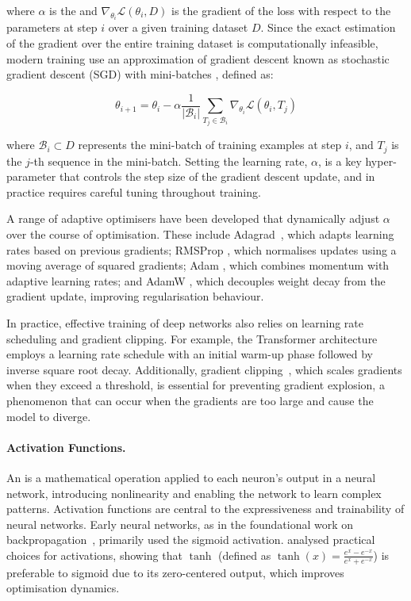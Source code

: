 where $\alpha$ is the  and $\nabla_{\theta_i} \mathcal{L}(\theta_i, D)$ is the gradient of the loss with respect to the parameters at step $i$ over a given training dataset $D$. Since the exact estimation of the gradient over the entire training dataset is computationally infeasible, modern training use an approximation of gradient descent known as stochastic gradient descent (SGD) with mini-batches \citep{robbins1951stochastic}, defined as:

\begin{equation}
    \theta_{i+1} = \theta_i - \alpha  \frac{1}{\lvert \mathcal{B}_i\rvert} \sum_{T_j \in \mathcal{B}_i} \nabla_{\theta_i} \mathcal{L}(\theta_i, T_j)
\end{equation}

where $\mathcal{B}_i \subset D$ represents the mini-batch of training examples at step $i$, and $T_j$ is the $j$-th sequence in the mini-batch. Setting the learning rate, $\alpha$, is a key hyper-parameter that controls the step size of the gradient descent update, and in practice requires careful tuning throughout training.

A range of adaptive optimisers have been developed that dynamically adjust $\alpha$ over the course of optimisation. These include Adagrad~\citep{duchi2011adaptive}, which adapts learning rates based on previous gradients; RMSProp \citep{tieleman2012lecture}, which normalises updates using a moving average of squared gradients; Adam \citep{kingma2015adam}, which combines momentum with adaptive learning rates; and AdamW \citep{loshchilov2019decoupled}, which decouples weight decay from the gradient update, improving regularisation behaviour.

In practice, effective training of deep networks also relies on learning rate scheduling and gradient clipping. For example, the Transformer architecture~\citep{vaswani2017attention} employs a learning rate schedule with an initial warm-up phase followed by inverse square root decay. Additionally, gradient clipping~\citep{pascanu2013difficulty}, which scales gradients when they exceed a threshold, is essential for preventing gradient explosion, a phenomenon that can occur when the gradients are too large and cause the model to diverge.

\paragraph{Activation Functions.} 

An  is a mathematical operation applied to each neuron's output in a neural network, introducing nonlinearity and enabling the network to learn complex patterns. Activation functions are central to the expressiveness and trainability of neural networks. Early neural networks, as in the foundational work on backpropagation~\citep{rumelhart1986learning}, primarily used the sigmoid activation. \citet{lecun1998efficient} analysed practical choices for activations, showing that $\tanh$ (defined as $\tanh(x) = \frac{e^x - e^{-x}}{e^x + e^{-x}}$) is preferable to sigmoid due to its zero-centered output, which improves optimisation dynamics.

